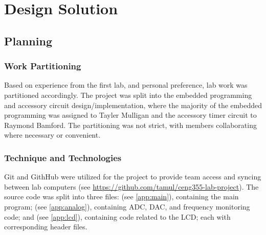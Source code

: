 
\section{Design Solution}
\subsection{Planning}
\subsubsection{Work Partitioning}
Based on experience from the first lab, and personal preference, lab
work was partitioned accordingly. The project was split into the
embedded programming and accessory circuit design/implementation, where
the majority of the embedded programming was assigned to Tayler Mulligan
and the accessory timer circuit to Raymond Bamford. The partitioning was
not strict, with members collaborating where necessary or convenient.

\subsubsection{Technique and Technologies}
Git and GithHub were utilized for the project to provide team access and
syncing between lab computers (see
\url{https://github.com/tamul/ceng355-lab-project}). The source code was
split into three files:  (see \ref{app:main}), containing the main program;
 (see \ref{app:analog}), containing ADC, DAC, and frequency monitoring
code; and  (see \ref{app:lcd}), containing code related to the LCD; each
with corresponding header files.
